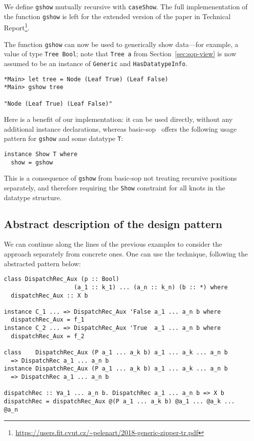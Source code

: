 \documentclass[runningheads]{llncs}
\newcommand{\K}[1]{\lstinline{#1}}
\begin{document}
We define \K{gshow} mutually recursive with \K{caseShow}. The full implemenentation of the function \K{gshow} is left for the extended version of the paper in Technical Report\footnote{\url{https://users.fit.cvut.cz/~pelenart/2018-generic-zipper-tr.pdf}}.

The function \K{gshow} can now be used to generically show data---for example, a value of type \K{Tree Bool}; note that \K{Tree a} from Section~\ref{sec:sop-view} is now assumed to be an instance of \K{Generic} and \K{HasDatatypeInfo}.
\begin{lstlisting}
*Main> let tree = Node (Leaf True) (Leaf False)
*Main> gshow tree

"Node (Leaf True) (Leaf False)"
\end{lstlisting}
Here is a benefit of our implementation: it can be used directly, without any additional instance declarations, whereas \textsf{basic-sop}~\cite{basic-sop} offers the following usage pattern for \K{gshow} and some datatype \K{T}:
\begin{lstlisting}
instance Show T where
  show = gshow
\end{lstlisting}
This is a consequence of \K{gshow} from \textsf{basic-sop} not treating recursive positions separately, and therefore requiring the \K{Show} constraint for all knots in the datatype structure.


\subsection{Abstract description of the design pattern}
\label{subsec:abstract-pattern}


We can continue along the lines of the previous examples to consider the approach separately from concrete ones. One can use the technique, following the abstracted pattern below:

\begin{lstlisting}
class DispatchRec_Aux (p :: Bool)
                    (a_1 :: k_1) ... (a_n :: k_n) (b :: *) where
  dispatchRec_Aux :: X b

instance C_1 ... => DispatchRec_Aux 'False a_1 ... a_n b where
  dispatchRec_Aux = f_1
instance C_2 ... => DispatchRec_Aux 'True  a_1 ... a_n b where
  dispatchRec_Aux = f_2

class    DispatchRec_Aux (P a_1 ... a_k b) a_1 ... a_k ... a_n b
  => DispatchRec a_1 ... a_n b
instance DispatchRec_Aux (P a_1 ... a_k b) a_1 ... a_k ... a_n b
  => DispatchRec a_1 ... a_n b

dispatchRec :: ∀a_1 ... a_n b. DispatchRec a_1 ... a_n b => X b
dispatchRec = dispatchRec_Aux @(P a_1 ... a_k b) @a_1 ... @a_k ... @a_n
\end{lstlisting}
\end{document}
